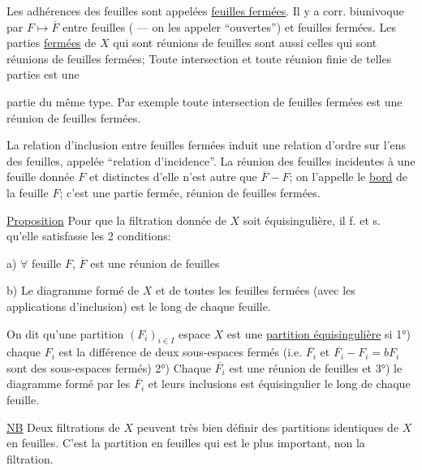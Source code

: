 Les adhérences des feuilles sont appelées \uline{feuilles fermées}. Il y a corr. biunivoque par $F\longmapsto\overline F$ entre feuilles ( --- on  les appeler ``ouvertes'') et feuilles fermées. Les parties \uline{fermées} de $X$ qui sont réunions de feuilles sont aussi celles qui sont réunions de feuilles fermées; Toute intersection et toute réunion finie de telles parties est une

partie du même type. Par exemple toute intersection de feuilles fermées est une réunion de feuilles fermées.

La relation d'inclusion entre feuilles fermées induit une relation d'ordre sur l'ens des feuilles, appelée ``relation d'incidence''. La réunion des feuilles incidentes à une feuille donnée $F$ et distinctes d'elle n'est autre que $\overline F-F$; on l'appelle le \uline{bord} de la feuille $F$; c'est  une partie fermée, réunion de feuilles fermées.

\uline{Proposition} Pour que la filtration donnée de $X$ soit équisingulière, il f. et s. qu'elle satisfasse les 2 conditions:

a) $\forall$ feuille $F$, $\overline F$ est une réunion de feuilles

b) Le diagramme formé de $X$ et de toutes les feuilles fermées (avec les applications d'inclusion) est   le long de chaque feuille.

On dit qu'une partition $(F_i)_{i\in I}$   espace $X$  est  une \uline{partition équisingulière} si 1°) chaque $F_i$ est la différence de deux sous-espaces fermés (i.e. $\overline{F_i}$ et $\overline{F_i}-F_i=bF_i$ sont des sous-espaces fermés) 2°) Chaque $\overline{F_i}$ est une réunion de feuilles et 3°) le diagramme formé par  les $\overline{F_i}$ et leurs inclusions est équisingulier le long de chaque feuille.

\uline{NB} Deux filtrations  de $X$ peuvent très bien définir des  partitions identiques de $X$ en feuilles. C'est la partition en feuilles qui est le plus important, non la filtration.

